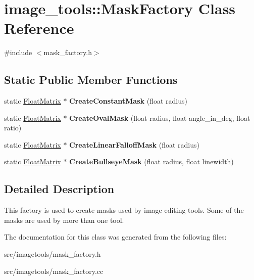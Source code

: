 \hypertarget{classimage__tools_1_1MaskFactory}{}\section{image\+\_\+tools\+:\+:Mask\+Factory Class Reference}
\label{classimage__tools_1_1MaskFactory}


{\ttfamily \#include $<$mask\+\_\+factory.\+h$>$}

\subsection*{Static Public Member Functions}
\begin{DoxyCompactItemize}
\item 
\mbox{\label{classimage__tools_1_1MaskFactory_a4295a2802f73937d77a90d4f1fb60e24}} 
static \hyperlink{classimage__tools_1_1FloatMatrix}{Float\+Matrix} $\ast$ {\bfseries Create\+Constant\+Mask} (float radius)
\item 
\mbox{\label{classimage__tools_1_1MaskFactory_a039d26821cc56aca61a16b9e55266d9a}} 
static \hyperlink{classimage__tools_1_1FloatMatrix}{Float\+Matrix} $\ast$ {\bfseries Create\+Oval\+Mask} (float radius, float angle\+\_\+in\+\_\+deg, float ratio)
\item 
\mbox{\label{classimage__tools_1_1MaskFactory_af7b0ecc4f1a758de1652fe4779556313}} 
static \hyperlink{classimage__tools_1_1FloatMatrix}{Float\+Matrix} $\ast$ {\bfseries Create\+Linear\+Falloff\+Mask} (float radius)
\item 
\mbox{\label{classimage__tools_1_1MaskFactory_ac2d7a5a550904745bdb9ec82e5f6e9db}} 
static \hyperlink{classimage__tools_1_1FloatMatrix}{Float\+Matrix} $\ast$ {\bfseries Create\+Bullseye\+Mask} (float radius, float linewidth)
\end{DoxyCompactItemize}


\subsection{Detailed Description}
This factory is used to create masks used by image editing tools. Some of the masks are used by more than one tool. 

The documentation for this class was generated from the following files\+:\begin{DoxyCompactItemize}
\item 
src/imagetools/mask\+\_\+factory.\+h\item 
src/imagetools/mask\+\_\+factory.\+cc\end{DoxyCompactItemize}
